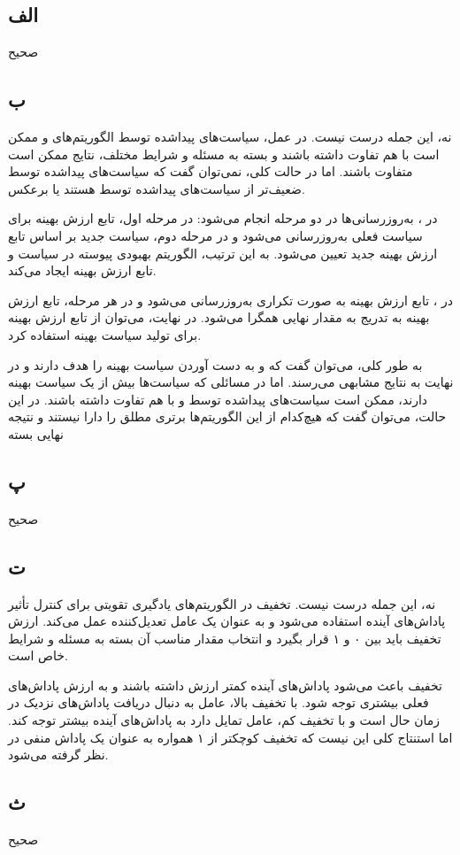 \subsection*{الف}

صحیح

\subsection*{ب}

نه، این جمله درست نیست. در عمل، سیاست‌های پیداشده توسط الگوریتم‌های
و
ممکن است با هم تفاوت داشته باشند و بسته به مسئله و شرایط مختلف، نتایج ممکن است متفاوت باشند. اما در حالت کلی، نمی‌توان گفت که سیاست‌های پیداشده توسط
ضعیف‌تر از سیاست‌های پیداشده توسط
هستند یا برعکس.

در
، به‌روزرسانی‌ها در دو مرحله انجام می‌شود: در مرحله اول، تابع ارزش بهینه برای سیاست فعلی به‌روزرسانی می‌شود و در مرحله دوم، سیاست جدید بر اساس تابع ارزش بهینه جدید تعیین می‌شود. به این ترتیب، الگوریتم
بهبودی پیوسته در سیاست و تابع ارزش بهینه ایجاد می‌کند.

در
، تابع ارزش بهینه به صورت تکراری به‌روزرسانی می‌شود و در هر مرحله، تابع ارزش بهینه به تدریج به مقدار نهایی همگرا می‌شود. در نهایت، می‌توان از تابع ارزش بهینه برای تولید سیاست بهینه استفاده کرد.

به طور کلی، می‌توان گفت که
و
به دست آوردن سیاست بهینه را هدف دارند و در نهایت به نتایج مشابهی می‌رسند. اما در مسائلی که سیاست‌ها بیش از یک سیاست بهینه دارند، ممکن است سیاست‌های پیداشده توسط
و
با هم تفاوت داشته باشند. در این حالت، می‌توان گفت که هیچ‌کدام از این الگوریتم‌ها برتری مطلق را دارا نیستند و نتیجه نهایی بسته 

\subsection*{پ}

صحیح

\subsection*{ت}

نه، این جمله درست نیست. تخفیف در الگوریتم‌های یادگیری تقویتی برای کنترل تأثیر پاداش‌های آینده استفاده می‌شود و به عنوان یک عامل تعدیل‌کننده
عمل می‌کند. ارزش تخفیف باید بین ۰ و ۱ قرار بگیرد و انتخاب مقدار مناسب آن بسته به مسئله و شرایط خاص است.

تخفیف باعث می‌شود پاداش‌های آینده کمتر ارزش داشته باشند و به ارزش پاداش‌های فعلی بیشتری توجه شود. با تخفیف بالا، عامل به دنبال دریافت پاداش‌های نزدیک در زمان حال است و با تخفیف کم، عامل تمایل دارد به پاداش‌های آینده بیشتر توجه کند. اما استنتاج کلی این نیست که تخفیف کوچکتر از ۱ همواره به عنوان یک پاداش منفی در نظر گرفته می‌شود.

\subsection*{ث}

صحیح